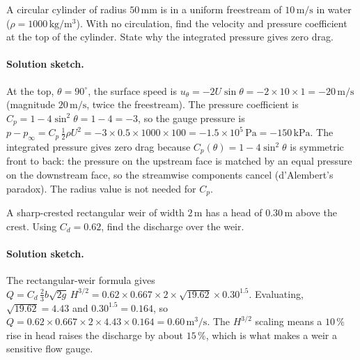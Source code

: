 \begin{exercise}
A circular cylinder of radius $50\,\si{\milli\meter}$ is in a
uniform freestream of $10\,\si{\meter\per\second}$ in water
($\rho = 1000\,\si{\kilogram\per\meter\cubed}$). With no
circulation, find the velocity and pressure coefficient at the top
of the cylinder. State why the integrated pressure gives zero
drag.

\paragraph{Solution sketch.} At the top, $\theta = 90^\circ$, the
surface speed is $u_\theta = -2U\sin\theta = -2\times 10\times 1 =
-20\,\si{\meter\per\second}$ (magnitude $20\,\si{\meter\per\second}$,
twice the freestream). The pressure coefficient is $C_p = 1 -
4\sin^2\theta = 1 - 4 = -3$, so the gauge pressure is $p - p_\infty =
C_p\,\tfrac12\rho U^2 = -3\times 0.5\times 1000\times 100 = -1.5\times
10^5\,\text{Pa} = -150\,\text{kPa}$. The integrated pressure gives
zero drag because $C_p(\theta) = 1 - 4\sin^2\theta$ is symmetric
front to back: the pressure on the upstream face is matched by an
equal pressure on the downstream face, so the streamwise components
cancel (d'Alembert's paradox). The radius value is not needed for
$C_p$.
\end{exercise}

\begin{exercise}
A sharp-crested rectangular weir of width $2\,\si{\meter}$ has a
head of $0.30\,\si{\meter}$ above the crest. Using $C_d = 0.62$,
find the discharge over the weir.

\paragraph{Solution sketch.} The rectangular-weir formula gives $Q =
C_d\,\tfrac23 b\sqrt{2g}\,H^{3/2} = 0.62\times 0.667\times 2\times
\sqrt{19.62}\times 0.30^{1.5}$. Evaluating, $\sqrt{19.62} = 4.43$ and
$0.30^{1.5} = 0.164$, so $Q = 0.62\times 0.667\times 2\times 4.43
\times 0.164 = 0.60\,\si{\meter\cubed\per\second}$. The $H^{3/2}$
scaling means a $10\,\%$ rise in head raises the discharge by about
$15\,\%$, which is what makes a weir a sensitive flow gauge.
\end{exercise}

